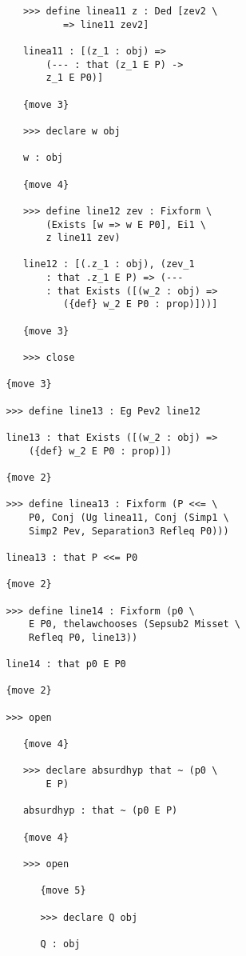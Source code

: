 \documentclass[12pt]{article}
\begin{document}
\begin{verbatim}
            >>> define linea11 z : Ded [zev2 \
                   => line11 zev2]

            linea11 : [(z_1 : obj) => 
                (--- : that (z_1 E P) -> 
                z_1 E P0)]

            {move 3}

            >>> declare w obj

            w : obj

            {move 4}

            >>> define line12 zev : Fixform \
                (Exists [w => w E P0], Ei1 \
                z line11 zev)

            line12 : [(.z_1 : obj), (zev_1 
                : that .z_1 E P) => (--- 
                : that Exists ([(w_2 : obj) => 
                   ({def} w_2 E P0 : prop)]))]

            {move 3}

            >>> close

         {move 3}

         >>> define line13 : Eg Pev2 line12

         line13 : that Exists ([(w_2 : obj) => 
             ({def} w_2 E P0 : prop)])

         {move 2}

         >>> define linea13 : Fixform (P <<= \
             P0, Conj (Ug linea11, Conj (Simp1 \
             Simp2 Pev, Separation3 Refleq P0)))

         linea13 : that P <<= P0

         {move 2}

         >>> define line14 : Fixform (p0 \
             E P0, thelawchooses (Sepsub2 Misset \
             Refleq P0, line13))

         line14 : that p0 E P0

         {move 2}

         >>> open

            {move 4}

            >>> declare absurdhyp that ~ (p0 \
                E P)

            absurdhyp : that ~ (p0 E P)

            {move 4}

            >>> open

               {move 5}

               >>> declare Q obj

               Q : obj


\end{verbatim}
\end{document}
